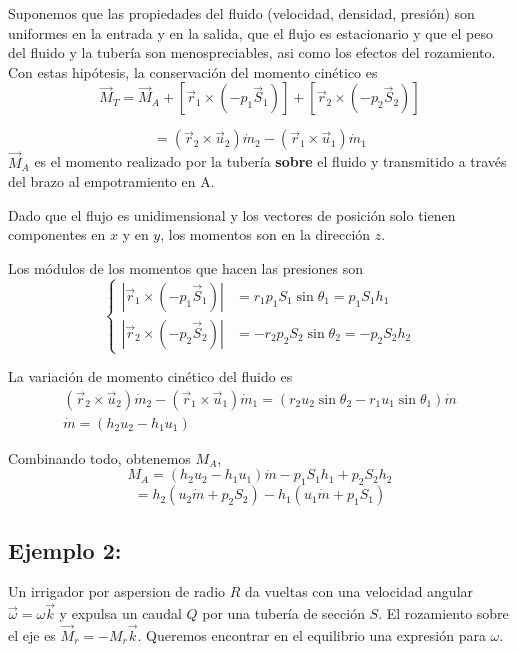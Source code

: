		Suponemos que las propiedades del fluido (velocidad, densidad, presión)
		son uniformes en la entrada y en la salida, que el flujo es estacionario
		y que el peso del fluido y la tubería son menospreciables, asi como
		los efectos del rozamiento. Con estas hipótesis, la conservación del
		momento cinético es 
		\[
		\vec{M}_{T}=\vec{M}_{A}+\left[\vec{r}_{1}\times\left(-p_{1}\vec{S}_{1}\right)\right]+\left[\vec{r}_{2}\times\left(-p_{2}\vec{S}_{2}\right)\right]
		\]
		
		\[
		=\left(\vec{r}_{2}\times\vec{u}_{2}\right)\dot{m}_{2}-\left(\vec{r}_{1}\times\vec{u}_{1}\right)\dot{m}_{1}
		\]
		$\vec{M}_{A}$ es el momento realizado por la tubería \textbf{sobre}
		el fluido y transmitido a través del brazo al empotramiento en A.
		
		Dado que el flujo es unidimensional y los vectores de posición solo
		tienen componentes en $x$ y en $y$, los momentos son en la dirección
		$z$.

		Los módulos de los momentos que hacen las presiones son 
		\[
		\begin{cases}
			\left|\vec{r}_{1}\times\left(-p_{1}\vec{S}_{1}\right)\right| & =r_{1}p_{1}S_{1}\sin\theta_{1}=p_{1}S_{1}h_{1}\\
			\left|\vec{r}_{2}\times\left(-p_{2}\vec{S}_{2}\right)\right| & =-r_{2}p_{2}S_{2}\sin\theta_{2}=-p_{2}S_{2}h_{2}
		\end{cases}
		\]
		
		La variación de momento cinético del fluido es 
		\begin{align*}
			\left(\vec{r}_{2}\times\vec{u}_{2}\right)\dot{m}_{2}-\left(\vec{r}_{1}\times\vec{u}_{1}\right)\dot{m}_{1}=\left(r_{2}u_{2}\sin\theta_{2}-r_{1}u_{1}\sin\theta_{1}\right)\dot{m}\\
			\dot{m}=\left(h_{2}u_{2}-h_{1}u_{1}\right)
		\end{align*}
		
		Combinando todo, obtenemos $M_{A}$, 
		\[
		M_{A}=\left(h_{2}u_{2}-h_{1}u_{1}\right)\dot{m}-p_{1}S_{1}h_{1}+p_{2}S_{2}h_{2}
		\]
		\[
		=h_{2}\left(u_{2}\dot{m}+p_{2}S_{2}\right)-h_{1}\left(u_{1}\dot{m}+p_{1}S_{1}\right)
		\]
	
	\subsection*{Ejemplo 2:}
		Un irrigador por aspersion de radio $R$ da vueltas con una velocidad
		angular $\vec{\omega}=\omega\vec{k}$ y expulsa un caudal $Q$ por
		una tubería de sección $S$. El rozamiento sobre el eje es $\vec{M}_{r}=-M_{r}\vec{k}$.
		Queremos encontrar en el equilibrio una expresión para $\omega$.
		
